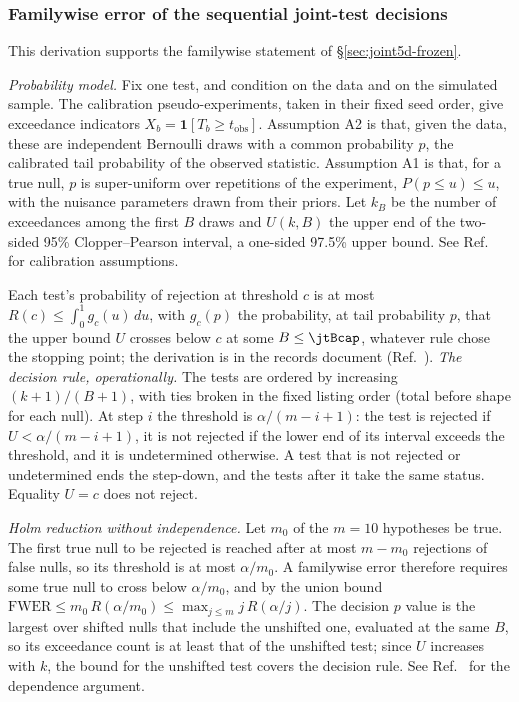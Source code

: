 \subsubsection{Familywise error of the sequential joint-test decisions}
\label{sec:joint5d-fwer}

This derivation supports the familywise statement of \S\ref{sec:joint5d-frozen}.

\emph{Probability model.} Fix one test, and condition on the data and on the simulated sample. The calibration pseudo-experiments, taken in their fixed seed order, give exceedance indicators $X_{b}=\mathbf{1}[T_{b}\ge t_{\mathrm{obs}}]$. Assumption A2 is that, given the data, these are independent Bernoulli draws with a common probability $p$, the calibrated tail probability of the observed statistic. Assumption A1 is that, for a true null, $p$ is super-uniform over repetitions of the experiment, $P(p\le u)\le u$, with the nuisance parameters drawn from their priors. Let $k_{B}$ be the number of exceedances among the first $B$ draws and $U(k,B)$ the upper end of the two-sided 95\% Clopper--Pearson interval, a one-sided 97.5\% upper bound. See Ref.~\cite{NoteRecords2026} for calibration assumptions.

Each test's probability of rejection at threshold $c$ is at most $R(c)\le\int_{0}^{1}g_{c}(u)\,du$, with $g_{c}(p)$ the probability, at tail probability $p$, that the upper bound $U$ crosses below $c$ at some $B\le\jtBcap$, whatever rule chose the stopping point; the derivation is in the records document (Ref.~\cite{NoteRecords2026}). \emph{The decision rule, operationally.}  The tests are ordered by increasing $(k+1)/(B+1)$, with ties broken in the fixed listing order (total before shape for each null).  At step $i$ the threshold is $\alpha/(m-i+1)$: the test is rejected if $U<\alpha/(m-i+1)$, it is not rejected if the lower end of its interval exceeds the threshold, and it is undetermined otherwise. A test that is not rejected or undetermined ends the step-down, and the tests after it take the same status.  Equality $U=c$ does not reject.

\emph{Holm reduction without independence.} Let $m_{0}$ of the $m=10$ hypotheses be true. The first true null to be rejected is reached after at most $m-m_{0}$ rejections of false nulls, so its threshold is at most $\alpha/m_{0}$. A familywise error therefore requires some true null to cross below $\alpha/m_{0}$, and by the union bound $\mathrm{FWER}\le m_{0}\,R(\alpha/m_{0})\le\max_{j\le m}j\,R(\alpha/j)$. The decision $p$ value is the largest over shifted nulls that include the unshifted one, evaluated at the same $B$, so its exceedance count is at least that of the unshifted test; since $U$ increases with $k$, the bound for the unshifted test covers the decision rule. See Ref.~\cite{NoteRecords2026} for the dependence argument.

